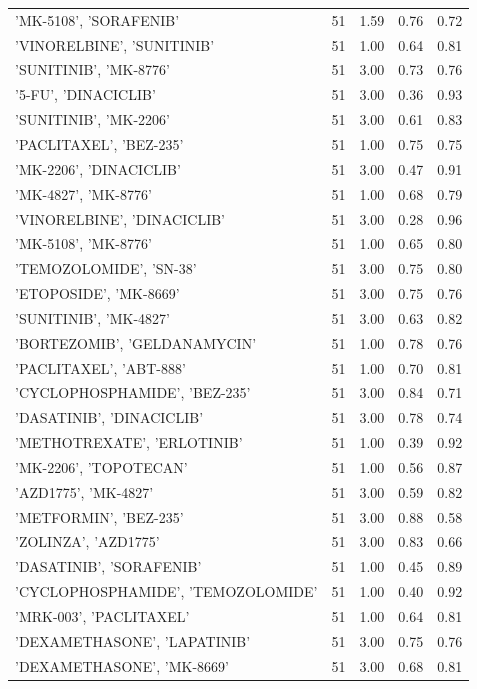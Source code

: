 \begin{center}
\begin{longtable}{@{}lcccc@{}}
\bottomrule
\endlastfoot
    'MK-5108', 'SORAFENIB' & 51 & 1.59 & 0.76 & 0.72 \\
    'VINORELBINE', 'SUNITINIB' & 51 & 1.00 & 0.64 & 0.81 \\
    'SUNITINIB', 'MK-8776' & 51 & 3.00 & 0.73 & 0.76 \\
    '5-FU', 'DINACICLIB' & 51 & 3.00 & 0.36 & 0.93 \\
    'SUNITINIB', 'MK-2206' & 51 & 3.00 & 0.61 & 0.83 \\
    'PACLITAXEL', 'BEZ-235' & 51 & 1.00 & 0.75 & 0.75 \\
    'MK-2206', 'DINACICLIB' & 51 & 3.00 & 0.47 & 0.91 \\
    'MK-4827', 'MK-8776' & 51 & 1.00 & 0.68 & 0.79 \\
    'VINORELBINE', 'DINACICLIB' & 51 & 3.00 & 0.28 & 0.96 \\
    'MK-5108', 'MK-8776' & 51 & 1.00 & 0.65 & 0.80 \\
    'TEMOZOLOMIDE', 'SN-38' & 51 & 3.00 & 0.75 & 0.80 \\
    'ETOPOSIDE', 'MK-8669' & 51 & 3.00 & 0.75 & 0.76 \\
    'SUNITINIB', 'MK-4827' & 51 & 3.00 & 0.63 & 0.82 \\
    'BORTEZOMIB', 'GELDANAMYCIN' & 51 & 1.00 & 0.78 & 0.76 \\
    'PACLITAXEL', 'ABT-888' & 51 & 1.00 & 0.70 & 0.81 \\
    'CYCLOPHOSPHAMIDE', 'BEZ-235' & 51 & 3.00 & 0.84 & 0.71 \\
    'DASATINIB', 'DINACICLIB' & 51 & 3.00 & 0.78 & 0.74 \\
    'METHOTREXATE', 'ERLOTINIB' & 51 & 1.00 & 0.39 & 0.92 \\
    'MK-2206', 'TOPOTECAN' & 51 & 1.00 & 0.56 & 0.87 \\
    'AZD1775', 'MK-4827' & 51 & 3.00 & 0.59 & 0.82 \\
    'METFORMIN', 'BEZ-235' & 51 & 3.00 & 0.88 & 0.58 \\
    'ZOLINZA', 'AZD1775' & 51 & 3.00 & 0.83 & 0.66 \\
    'DASATINIB', 'SORAFENIB' & 51 & 1.00 & 0.45 & 0.89 \\
    'CYCLOPHOSPHAMIDE', 'TEMOZOLOMIDE' & 51 & 1.00 & 0.40 & 0.92 \\
    'MRK-003', 'PACLITAXEL' & 51 & 1.00 & 0.64 & 0.81 \\
    'DEXAMETHASONE', 'LAPATINIB' & 51 & 3.00 & 0.75 & 0.76 \\
    'DEXAMETHASONE', 'MK-8669' & 51 & 3.00 & 0.68 & 0.81 \\

\end{longtable}
\end{center}
